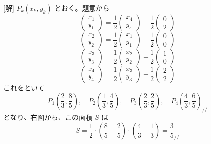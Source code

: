 \documentclass[../main.tex]{subfiles}
\begin{document}
[解] $P_k(x_k, y_k)$ とおく。題意から
\[
  \begin{pmatrix} x_1 \\ y_1
  \end{pmatrix} = \frac{1}{2}
  \begin{pmatrix} x_4 \\ y_4
  \end{pmatrix} + \frac{1}{2}
  \begin{pmatrix} 0 \\ 2
  \end{pmatrix}
\]
\[
  \begin{pmatrix} x_2 \\ y_2
  \end{pmatrix} = \frac{1}{2}
  \begin{pmatrix} x_1 \\ y_1
  \end{pmatrix} + \frac{1}{2}
  \begin{pmatrix} 0 \\ 0
  \end{pmatrix}
\]
\[
  \begin{pmatrix} x_3 \\ y_3
  \end{pmatrix} = \frac{1}{2}
  \begin{pmatrix} x_2 \\ y_2
  \end{pmatrix} + \frac{1}{2}
  \begin{pmatrix} 1 \\ 0
  \end{pmatrix}
\]
\[
  \begin{pmatrix} x_4 \\ y_4
  \end{pmatrix} = \frac{1}{2}
  \begin{pmatrix} x_3 \\ y_3
  \end{pmatrix} + \frac{1}{2}
  \begin{pmatrix} 2 \\ 2
  \end{pmatrix}
\]
これをといて
\[
  P_1\left(\frac{2}{3}, \frac{8}{5}\right), \quad P_2\left(\frac{1}{3}, \frac{4}{5}\right), \quad P_3\left(\frac{2}{3}, \frac{2}{5}\right), \quad P_4\left(\frac{4}{3}, \frac{6}{5}\right)_{\mathbin{/\!/}}
\]
となり、右図から、この面積 $S$ は
\[
  S = \frac{1}{2} \cdot \left(\frac{8}{5} - \frac{2}{5}\right) \cdot \left(\frac{4}{3} - \frac{1}{3}\right) = \frac{3}{5}_{\mathbin{/\!/}}
\]
\end{document}

